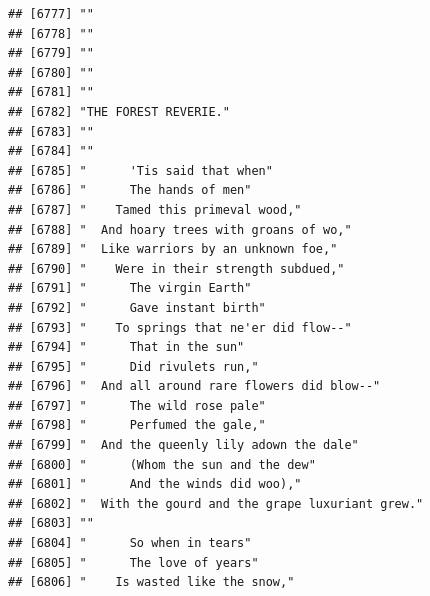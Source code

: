 \documentclass{article}\usepackage[]{graphicx}\usepackage[]{color}
\makeatletter
\newenvironment{kframe}{%
 \def\at@end@of@kframe{}%
 \ifinner\ifhmode%
  \def\at@end@of@kframe{\end{minipage}}%
  \begin{minipage}{\columnwidth}%
 \fi\fi%
 \def\FrameCommand##1{\hskip\@totalleftmargin \hskip-\fboxsep
 \colorbox{shadecolor}{##1}\hskip-\fboxsep
     \hskip-\linewidth \hskip-\@totalleftmargin \hskip\columnwidth}%
 \MakeFramed {\advance\hsize-\width
   \@totalleftmargin\z@ \linewidth\hsize
   \@setminipage}}%
 {\par\unskip\endMakeFramed%
 \at@end@of@kframe}
\newenvironment{knitrout}{}{} %
\makeatother
\begin{document}
\begin{knitrout}
\begin{kframe}
\begin{verbatim}
## [6777] ""                                                                            
## [6778] ""                                                                            
## [6779] ""                                                                            
## [6780] ""                                                                            
## [6781] ""                                                                            
## [6782] "THE FOREST REVERIE."                                                         
## [6783] ""                                                                            
## [6784] ""                                                                            
## [6785] "      'Tis said that when"                                                   
## [6786] "      The hands of men"                                                      
## [6787] "    Tamed this primeval wood,"                                               
## [6788] "  And hoary trees with groans of wo,"                                        
## [6789] "  Like warriors by an unknown foe,"                                          
## [6790] "    Were in their strength subdued,"                                         
## [6791] "      The virgin Earth"                                                      
## [6792] "      Gave instant birth"                                                    
## [6793] "    To springs that ne'er did flow--"                                        
## [6794] "      That in the sun"                                                       
## [6795] "      Did rivulets run,"                                                     
## [6796] "  And all around rare flowers did blow--"                                    
## [6797] "      The wild rose pale"                                                    
## [6798] "      Perfumed the gale,"                                                    
## [6799] "  And the queenly lily adown the dale"                                       
## [6800] "      (Whom the sun and the dew"                                             
## [6801] "      And the winds did woo),"                                               
## [6802] "  With the gourd and the grape luxuriant grew."                              
## [6803] ""                                                                            
## [6804] "      So when in tears"                                                      
## [6805] "      The love of years"                                                     
## [6806] "    Is wasted like the snow,"                                                

\end{verbatim}
\end{kframe}
\end{knitrout}
\end{document}
